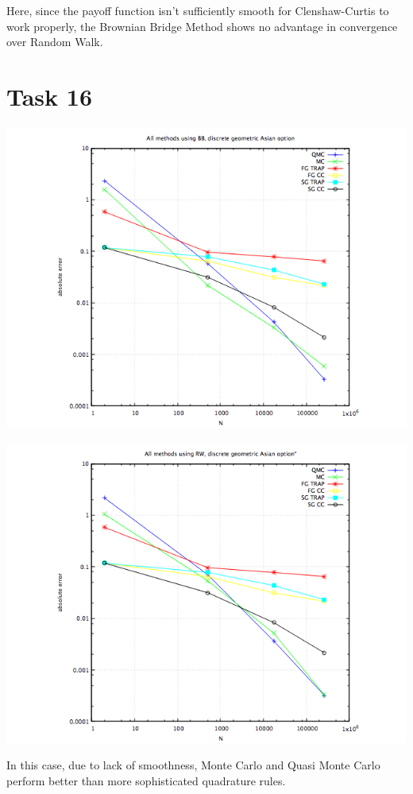\documentclass[10pt,a4paper]{article}
\begin{document}
Here, since the payoff function isn't sufficiently smooth for Clenshaw-Curtis to work properly, the Brownian Bridge Method shows no advantage in convergence over Random Walk. 

\section*{Task 16}
\begin{center}
\includegraphics[scale=0.5]{task16bb.png}
\end{center}
\begin{center}
\includegraphics[scale=0.5]{task16rw.png}
\end{center}
In this case, due to lack of smoothness, Monte Carlo and Quasi Monte Carlo perform better than more sophisticated quadrature rules. 
\end{document}
